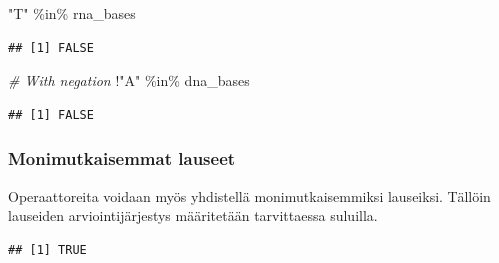 \documentclass[
]{book}
\newenvironment{Shaded}{\begin{snugshade}}{\end{snugshade}}
\newcommand{\AttributeTok}[1]{\textcolor[rgb]{0.77,0.63,0.00}{#1}}
\newcommand{\CommentTok}[1]{\textcolor[rgb]{0.56,0.35,0.01}{\textit{#1}}}
\newcommand{\DecValTok}[1]{\textcolor[rgb]{0.00,0.00,0.81}{#1}}
\newcommand{\FunctionTok}[1]{\textcolor[rgb]{0.00,0.00,0.00}{#1}}
\newcommand{\NormalTok}[1]{#1}
\newcommand{\OtherTok}[1]{\textcolor[rgb]{0.56,0.35,0.01}{#1}}
\newcommand{\SpecialCharTok}[1]{\textcolor[rgb]{0.00,0.00,0.00}{#1}}
\newcommand{\StringTok}[1]{\textcolor[rgb]{0.31,0.60,0.02}{#1}}
\begin{document}
\begin{Shaded}
\begin{Highlighting}[]
\StringTok{"T"} \SpecialCharTok{\%in\%}\NormalTok{ rna\_bases}
\end{Highlighting}
\end{Shaded}

\begin{verbatim}
## [1] FALSE
\end{verbatim}

\begin{Shaded}
\begin{Highlighting}[]
\CommentTok{\# With negation}
\SpecialCharTok{!}\StringTok{"A"} \SpecialCharTok{\%in\%}\NormalTok{ dna\_bases}
\end{Highlighting}
\end{Shaded}

\begin{verbatim}
## [1] FALSE
\end{verbatim}

\hypertarget{monimutkaisemmat-lauseet}{%
\subsubsection{Monimutkaisemmat lauseet}\label{monimutkaisemmat-lauseet}}

Operaattoreita voidaan myös yhdistellä monimutkaisemmiksi lauseiksi. Tällöin lauseiden arviointijärjestys määritetään tarvittaessa suluilla.

\begin{Shaded}
\end{Shaded}

\begin{verbatim}
## [1] TRUE
\end{verbatim}
\end{document}
